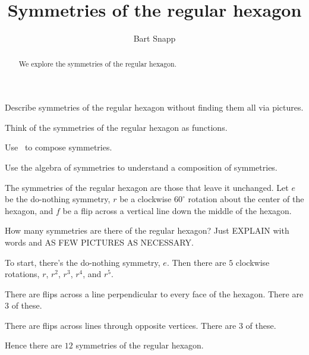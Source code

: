 \documentclass[noauthor,nooutcomes,hints,handout]{ximera}
\title{Symmetries of the regular hexagon}
\author{Bart Snapp}
\begin{document}
\begin{abstract}
  We explore the symmetries of the regular hexagon.
\end{abstract}
\maketitle

\begin{listOutcomes}
\item Describe symmetries of the regular hexagon without finding them
  all via pictures.
\item Think of the symmetries of the regular hexagon as functions.
\item Use \snap\ to compose symmetries.
\item Use the algebra of symmetries to understand a composition of
  symmetries.
\end{listOutcomes}
\mynewpage


\begin{question}
  The symmetries of the regular hexagon are those that leave it
  unchanged. Let $e$ be the do-nothing symmetry, $r$ be a clockwise
  $60^\circ$ rotation about the center of the hexagon, and $f$ be a
  flip across a vertical line down the middle of the hexagon.

  
  How many symmetries are there of the regular hexagon? Just
  EXPLAIN with words and AS FEW PICTURES AS NECESSARY.
  \begin{freeResponse}
    To start, there's the do-nothing symmetry, $e$. Then there are
    $5$ clockwise rotations, $r$, $r^2$, $r^3$, $r^4$, and $r^5$.

    There are flips across a line perpendicular to every face of the
    hexagon. There are $3$ of these.

    There are flips across lines through opposite vertices. There are
    $3$ of these.

    Hence there are $12$ symmetries of the regular hexagon.
  \end{freeResponse}
\end{question}
\mynewpage
\end{document}
